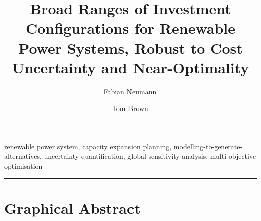 \documentclass[1p,11pt]{elsarticle}
\begin{document}
\begin{frontmatter}

	\title{Broad Ranges of Investment Configurations for Renewable Power
	Systems, Robust to Cost Uncertainty and Near-Optimality}

	\author[tubaddress,kitaddress]{Fabian Neumann\,}
	\author[tubaddress,kitaddress]{Tom Brown\,}
	\address[tubaddress]{Department of Digital Transformation in Energy Systems, Institute of Energy Technology, Technische Universität Berlin (TUB), Einsteinufer 25 (TA 8), 10587, Berlin, Germany}
	\address[kitaddress]{Institute for Automation and Applied Informatics (IAI), Karlsruhe Institute of Technology (KIT), Hermann-von-Helmholtz-Platz 1, 76344, Eggenstein-Leopoldshafen, Germany}

	\begin{abstract}
		
	\end{abstract}

	\begin{keyword}
		renewable power system, capacity expansion planning, modelling-to-generate-alternatives, uncertainty quantification, global sensitivity analysis, multi-objective optimisation
	\end{keyword}

\end{frontmatter}




\newpage


\par\noindent\rule{\textwidth}{0.4pt}

\section*{Graphical Abstract}
\end{document}
